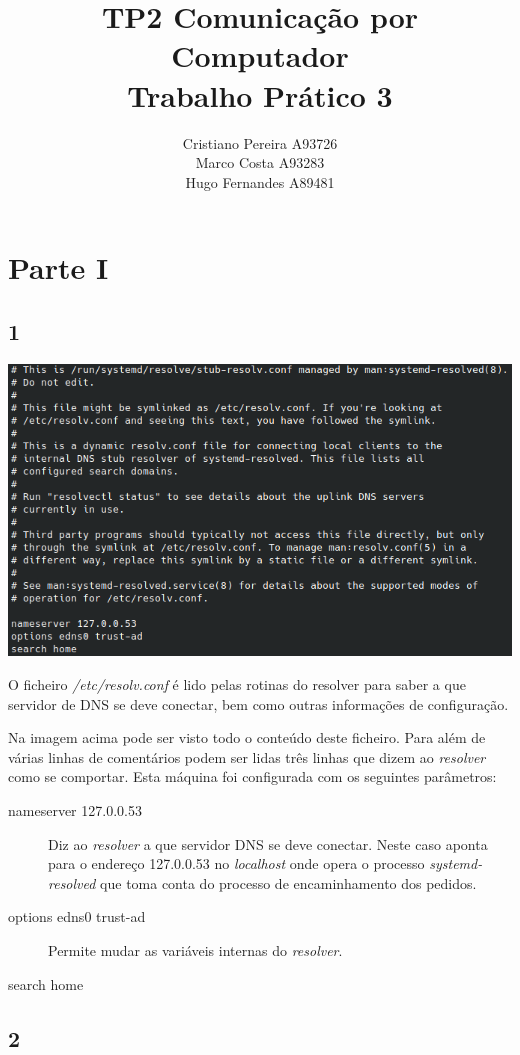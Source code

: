 \documentclass[size=11pt]{report}
\title{TP2}
\title{
    Comunicação por Computador \\
    \large{Trabalho Prático 3}
}
\author{
    Cristiano Pereira A93726 \\
    Marco Costa A93283 \\
    Hugo Fernandes A89481
}
\affil{
    Universidade do Minho \\
    Departamento de Informática
}
\begin{document}
    \maketitle
    \newpage

    \section*{Parte I}
        \subsection*{1}
            \noindent
            \includegraphics[width=\textwidth]{images/resolv.conf.png}
            \par
                    O ficheiro \textit{/etc/resolv.conf} é lido pelas rotinas do resolver para saber
                a que servidor de DNS se deve conectar, bem como outras informações de configuração.\par 
                    Na imagem acima pode ser visto todo o conteúdo deste ficheiro. Para além de várias linhas de comentários
                podem ser lidas três linhas que dizem ao \textit{resolver} como se comportar. Esta máquina foi configurada com os seguintes parâmetros: 
                \begin{description}
                    \item[nameserver 127.0.0.53] Diz ao \textit{resolver} a que servidor DNS se deve conectar. Neste caso aponta para o endereço 127.0.0.53 no
                    \textit{localhost} onde opera o processo \textit{systemd-resolved} que toma conta do processo de encaminhamento dos pedidos.
                    \item[options edns0 trust-ad] Permite mudar as variáveis internas do \textit{resolver}.
                    \item[search home]   
                \end{description}
            \pagebreak
        \subsection*{2}
\end{document}
